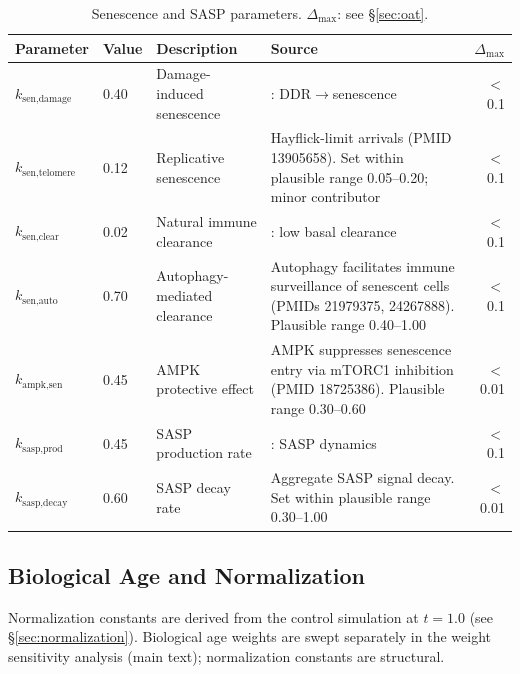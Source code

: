 \documentclass[11pt]{article}
\begin{document}
\begin{table}[H]
\centering
\caption{Senescence and SASP parameters. $\Delta_{\max}$: see \S\ref{sec:oat}.}
\begin{tabular}{|ll|p{3cm}|p{6cm}|r|}
\hline
Parameter & Value & Description & Source & $\Delta_{\max}$ \\
\hline
$k_{\text{sen,damage}}$ & 0.40 & Damage-induced senescence & \citet{Campisi2007}: DDR$\to$senescence & $<$0.1 \\
\hline
$k_{\text{sen,telomere}}$ & 0.12 & Replicative senescence & Hayflick-limit arrivals (PMID 13905658). Set within plausible range 0.05--0.20; minor contributor & $<$0.1 \\
\hline
$k_{\text{sen,clear}}$ & 0.02 & Natural immune clearance & \citet{Baker2016}: low basal clearance & $<$0.1 \\
\hline
$k_{\text{sen,auto}}$ & 0.70 & Autophagy-mediated clearance & Autophagy facilitates immune surveillance of senescent cells (PMIDs 21979375, 24267888). Plausible range 0.40--1.00 & $<$0.1 \\
\hline
$k_{\text{ampk,sen}}$ & 0.45 & AMPK protective effect & AMPK suppresses senescence entry via mTORC1 inhibition (PMID 18725386). Plausible range 0.30--0.60 & $<$0.01 \\
\hline
$k_{\text{sasp,prod}}$ & 0.45 & SASP production rate & \citet{Coppe2008}: SASP dynamics & $<$0.1 \\
\hline
$k_{\text{sasp,decay}}$ & 0.60 & SASP decay rate & Aggregate SASP signal decay. Set within plausible range 0.30--1.00 & $<$0.01 \\
\hline
\end{tabular}
\end{table}

\subsection{Biological Age and Normalization}

Normalization constants are derived from the control simulation at $t = 1.0$ (see \S\ref{sec:normalization}). Biological age weights are swept separately in the weight sensitivity analysis (main text); normalization constants are structural.
\end{document}
